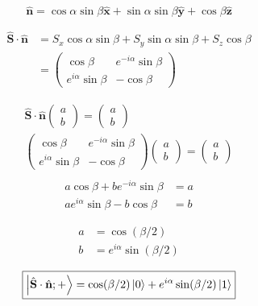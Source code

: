 \documentclass{article}
\begin{document}
\begin{equation*}
    \hat{\mathbf{n}}=\cos \alpha \sin \beta \hat{\mathbf{x}} + \sin \alpha \sin \beta \hat{\mathbf{y}}+ \cos \beta \hat{\mathbf{z}}
\end{equation*}

\begin{align*}
    \hat{\mathbf{S}} \cdot \hat{\mathbf{n}} &= S_{x} \cos \alpha \sin \beta+S_{y} \sin \alpha \sin \beta+S_{z} \cos \beta\\
    &=\left(\begin{array}{cc}
\cos \beta & e^{-i \alpha} \sin \beta \\
e^{i \alpha} \sin \beta & -\cos \beta
\end{array}\right)
\end{align*}

\begin{align*}
    \hat{\mathbf{S}} \cdot \hat{\mathbf{n}}\left(\begin{array}{l}
    a \\
    b
    \end{array}\right)=\left(\begin{array}{l}
    a \\
    b
    \end{array}\right)\\
    \left(\begin{array}{cc}
\cos \beta & e^{-i \alpha} \sin \beta \\
e^{i \alpha} \sin \beta & -\cos \beta
\end{array}\right)\left(\begin{array}{l}
    a \\
    b
    \end{array}\right) = \left(\begin{array}{l}
    a \\
    b
    \end{array}\right)\\
\end{align*}    
\begin{align*}
a \cos \beta+b e^{-i \alpha} \sin \beta &=a \\
a e^{i \alpha} \sin \beta-b \cos \beta &=b
\end{align*}

\begin{align*}
    a&=\cos (\beta / 2)\\
    b&= e^{i \alpha} \sin (\beta / 2) 
\end{align*}

\begin{equation*}
\boxed{
    \ket{\hat{\mathbf{S}} \cdot \hat{\mathbf{n}} ;+} = \cos (\beta / 2) \ket{0} + e^{i \alpha} \sin (\beta / 2) \ket{1}
    }
\end{equation*}
\end{document}
